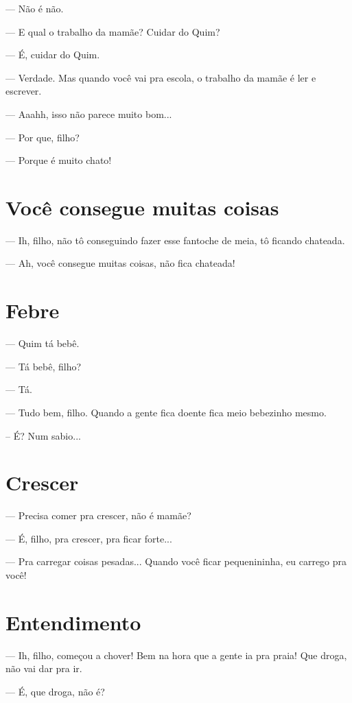 --- Não é não.

--- E qual o trabalho da mamãe? Cuidar do Quim?

--- É, cuidar do Quim.

--- Verdade. Mas quando você vai pra escola, o trabalho da mamãe é ler e
escrever.

--- Aaahh, isso não parece muito bom...

--- Por que, filho?

--- Porque é muito chato!

\chapter{Você consegue muitas
coisas}\label{vocuxea-consegue-muitas-coisas}

--- Ih, filho, não tô conseguindo fazer esse fantoche de meia, tô
ficando chateada.

--- Ah, você consegue muitas coisas, não fica chateada!

\chapter{Febre}\label{febre}

--- Quim tá bebê.

--- Tá bebê, filho?

--- Tá.

--- Tudo bem, filho. Quando a gente fica doente fica meio bebezinho
mesmo.

-- É? Num sabio...

\chapter{Crescer}\label{crescer}

--- Precisa comer pra crescer, não é mamãe?

--- É, filho, pra crescer, pra ficar forte...

--- Pra carregar coisas pesadas... Quando você ficar pequenininha, eu
carrego pra você!

\chapter{Entendimento}\label{entendimento}

--- Ih, filho, começou a chover! Bem na hora que a gente ia pra praia!
Que droga, não vai dar pra ir.

--- É, que droga, não é?


